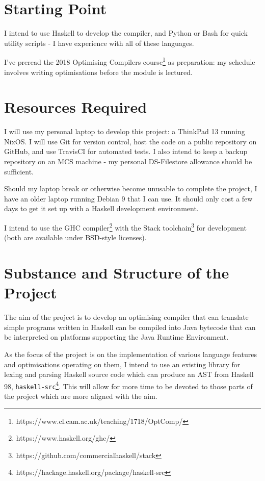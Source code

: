 \documentclass[12pt]{article}
\newcommand\monospace[1]{\texttt{#1}}
\begin{document}
\section*{Starting Point}

I intend to use Haskell to develop the compiler, and Python or Bash for quick utility scripts - I have experience with
all of these languages.

I've preread the 2018 Optimising Compilers course\footnote{https://www.cl.cam.ac.uk/teaching/1718/OptComp/} as
preparation: my schedule involves writing optimisations before the module is lectured.


\section*{Resources Required}

I will use my personal laptop to develop this project: a ThinkPad 13 running NixOS. I will use Git for version control,
host the code on a public repository on GitHub, and use TravisCI for automated tests. I also intend to keep a backup
repository on an MCS machine - my personal DS-Filestore allowance should be sufficient.

Should my laptop break or otherwise become unusable to complete the project, I have an older laptop running Debian 9
that I can use. It should only cost a few days to get it set up with a Haskell development environment.

I intend to use the GHC compiler\footnote{https://www.haskell.org/ghc/} with the Stack
toolchain\footnote{https://github.com/commercialhaskell/stack} for development (both are available under BSD-style
licenses).


\section*{Substance and Structure of the Project}

The aim of the project is to develop an optimising compiler that can translate simple programs written in Haskell can be
compiled into Java bytecode that can be interpreted on platforms supporting the Java Runtime Environment.

As the focus of the project is on the implementation of various language features and optimisations operating on them, I
intend to use an existing library for lexing and parsing Haskell source code which can produce an AST from Haskell 98,
\monospace{haskell-src}\footnote{https://hackage.haskell.org/package/haskell-src}. This will allow for more time to be
devoted to those parts of the project which are more aligned with the aim.
\end{document}
